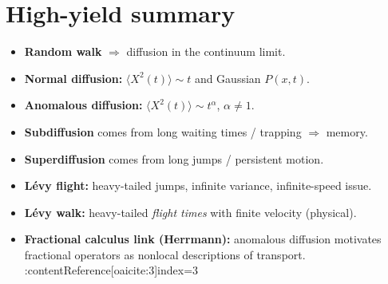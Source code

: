 \section{High-yield summary}
\begin{itemize}
\item \textbf{Random walk} $\Rightarrow$ diffusion in the continuum limit.
\item \textbf{Normal diffusion:} $\langle X^2(t)\rangle \sim t$ and Gaussian $P(x,t)$.
\item \textbf{Anomalous diffusion:} $\langle X^2(t)\rangle \sim t^\alpha$, $\alpha\neq 1$.
\item \textbf{Subdiffusion} comes from long waiting times / trapping $\Rightarrow$ memory.
\item \textbf{Superdiffusion} comes from long jumps / persistent motion.
\item \textbf{Lévy flight:} heavy-tailed jumps, infinite variance, infinite-speed issue.
\item \textbf{Lévy walk:} heavy-tailed \emph{flight times} with finite velocity (physical).
\item \textbf{Fractional calculus link (Herrmann):} anomalous diffusion motivates fractional operators
as nonlocal descriptions of transport. :contentReference[oaicite:3]{index=3}
\end{itemize}
